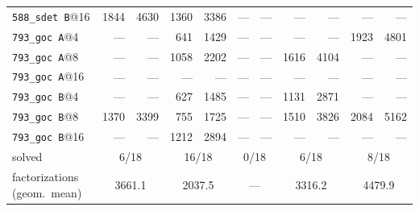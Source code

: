 \begin{table}[tbp]
\begin{tabular}{lrrrrrrrrrr}
\texttt{588\_sdet~B}@16 & 1844 & 4630 & 1360 & 3386 & --- & --- & --- & --- & --- & --- \\
\texttt{793\_goc~A}@4 & --- & --- & 641 & 1429 & --- & --- & --- & --- & 1923 & 4801 \\
\texttt{793\_goc~A}@8 & --- & --- & 1058 & 2202 & --- & --- & 1616 & 4104 & --- & --- \\
\texttt{793\_goc~A}@16 & --- & --- & --- & --- & --- & --- & --- & --- & --- & --- \\
\texttt{793\_goc~B}@4 & --- & --- & 627 & 1485 & --- & --- & 1131 & 2871 & --- & --- \\
\texttt{793\_goc~B}@8 & 1370 & 3399 & 755 & 1725 & --- & --- & 1510 & 3826 & 2084 & 5162 \\
\texttt{793\_goc~B}@16 & --- & --- & 1212 & 2894 & --- & --- & --- & --- & --- & --- \\
\midrule solved & \multicolumn{2}{c}{6/18} & \multicolumn{2}{c}{16/18} & \multicolumn{2}{c}{0/18} & \multicolumn{2}{c}{6/18} & \multicolumn{2}{c}{8/18} \\
factorizations (geom.\ mean) & \multicolumn{2}{c}{3661.1} & \multicolumn{2}{c}{2037.5} & \multicolumn{2}{c}{---} & \multicolumn{2}{c}{3316.2} & \multicolumn{2}{c}{4479.9} \\
\bottomrule\end{tabular}\end{table}
